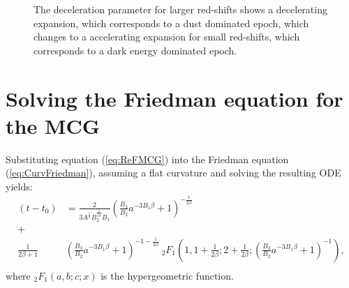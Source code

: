 \documentclass[a0,portrait]{a0poster}
\newcommand{\brac}[1]{\left(#1\right)}
\renewcommand{\baselinestretch}{0.85}
\begin{document}
\begin{multicols}{2}
\begin{minipage}{.24\textwidth}
\begin{figure}[H]
\caption{The deceleration parameter for larger red-shifts shows a decelerating expansion, which corresponds to a dust dominated epoch, which changes to a accelerating expansion for small red-shifts, which corresponds to a dark energy dominated epoch.}
\renewcommand{\baselinestretch}{0.85}
\label{fig:ChDecel}
\end{figure}
\end{minipage}


\color{Navy} %
\section*{Solving the Friedman equation for the MCG}
Substituting equation (\ref{eq:ReFMCG}) into the Friedman equation (\ref{eq:CurvFriedman}), assuming a flat curvature and solving the resulting ODE yields:
\begin{equation}\label{eq:FmEqMCGSol}
\begin{split}
\brac{t-t_{0}}&=\frac{2}{3A^{\frac{1}{2}}B_{2}^{\frac{1}{2\beta}}B_{1}}\brac{\frac{B_{3}}{B_{2}}a^{-3B_{1}\beta}+1}^{-\frac{1}{2\beta}}\\
+\\ \frac{1}{2\beta+1}&\brac{\frac{B_{3}}{B_{2}}a^{-3B_{1}\beta}+1}^{-1-\frac{1}{2\beta}}\ _{2}F_{1}\brac{1,1+\frac{1}{2\beta};2+\frac{1}{2\beta};\brac{\frac{B_{3}}{B_{2}}a^{-3B_{1}\beta}+1}^{-1}},\\
\end{split}
\end{equation}
where $_{2}F_{1}\brac{a,b;c;x}$ is the hypergeometric function. \\


\end{multicols}
\end{document}
